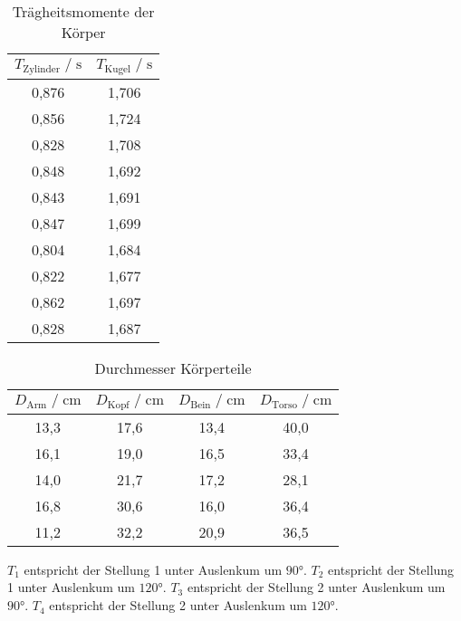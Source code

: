 \begin{table}
    \centering
     \caption{Trägheitsmomente der Körper}
     \label{tab:traegheitsmomente}
     \begin{tabular}{c c}
        \toprule
        $ T_{\text{Zylinder}} \;/\; \si{\second}$ & $ T_{\text{Kugel}} \;/\; \si{\second}$ \\
        \midrule
        0,876 & 1,706 \\
        0,856 & 1,724 \\
        0,828 & 1,708 \\
        0,848 & 1,692 \\
        0,843 & 1,691 \\
        0,847 & 1,699 \\
        0,804 & 1,684 \\
        0,822 & 1,677 \\
        0,862 & 1,697 \\
        0,828 & 1,687 \\
        \bottomrule
     \end{tabular}
 \end{table}

\begin{table}
\centering
    \caption{Durchmesser Körperteile}
    \label{tab:durchmesser}
    \begin{tabular}{c c c c}
    \toprule
    $D_\text{Arm} \;/\; \si{\centi\meter}$ & $D_\text{Kopf} \;/\; \si{\centi\meter}$ & $D_\text{Bein} \;/\; \si{\centi\meter}$ & $D_\text{Torso} \;/\; \si{\centi\meter}$ \\
    \midrule
    13,3 & 17,6 & 13,4 & 40,0 \\
    16,1 & 19,0 & 16,5 & 33,4 \\
    14,0 & 21,7 & 17,2 & 28,1 \\
    16,8 & 30,6 & 16,0 & 36,4 \\
    11,2 & 32,2 & 20,9 & 36,5 \\
    \bottomrule
    \end{tabular}
\end{table}

$T_1$ entspricht der Stellung 1 unter Auslenkum um $90°$.
$T_2$ entspricht der Stellung 1 unter Auslenkum um $120°$.
$T_3$ entspricht der Stellung 2 unter Auslenkum um $90°$.
$T_4$ entspricht der Stellung 2 unter Auslenkum um $120°$.

